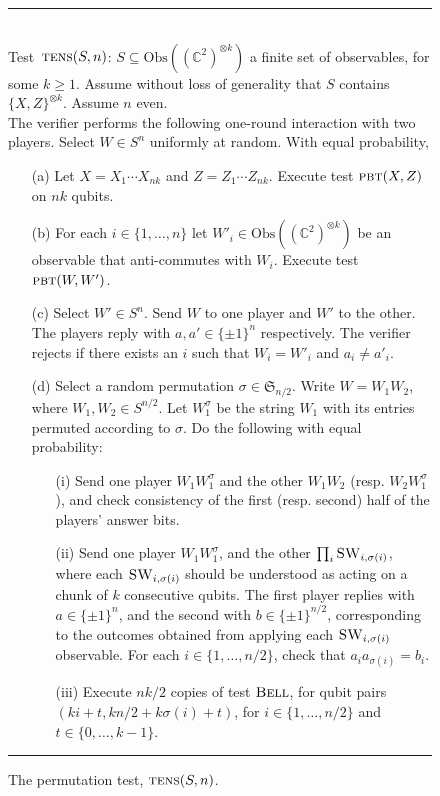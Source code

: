 \documentclass[11pt]{article}
\theoremstyle{remark}
\theoremstyle{definition}
\newcommand{\C}{\ensuremath{\mathbb{C}}}
\newcommand{\setft}[1]{\mathrm{#1}}
\newcommand{\Obs}{\setft{Obs}}
\newcommand{\pbt}{\textsc{pbt}}
\newcommand{\perm}{\textsc{tens}}
\newcommand{\bellt}{\textsc{Bell}}
\newcommand{\SWAP}{\textsc{SW}}
\begin{document}
\begin{figure}[H]
\rule[1ex]{16.5cm}{0.5pt}\\
Test~$\perm(S,n)$: $S\subseteq \Obs((\C^2)^{\otimes k})$ a finite set of observables, for some $k\geq 1$. Assume without loss of generality that $S$ contains $\{X,Z\}^{\otimes k}$. Assume $n$ even. \\
The verifier performs the following one-round interaction with two
players. Select $W \in S^n$ uniformly at random. With equal probability,
\begin{enumerate}
\item[(a)] Let $X = X_1\cdots X_{nk}$ and $Z=Z_1\cdots Z_{nk}$. Execute test $\pbt(X,Z)$ on $nk$ qubits. 
\item[(b)] For each $i\in\{1,\ldots,n\}$ let $W'_i\in\Obs((\C^2)^{\otimes k})$ be an observable that anti-commutes with $W_i$. Execute test $\pbt(W,W')$. 
\item[(c)] Select $W' \in S^n$. Send $W$ to one player and $W'$ to the other. The players reply with $a,a'\in\{\pm 1\}^n$ respectively. The verifier rejects if there exists an $i$ such that $W_i=W'_i$ and $a_i\neq a'_i$.
\item[(d)] Select a random permutation  $\sigma \in \mathfrak{S}_{n/2}$. Write $W=W_1 W_2$, where $W_1,W_2\in S^{n/2}$. Let $W_1^\sigma$ be the string $W_1$ with its entries permuted according to $\sigma$. Do the following with equal probability: 
\begin{enumerate}
\item[(i)] Send one player $W_1 W_1^\sigma$ and the other $W_1 W_2$ (resp. $W_2W_1^\sigma$), and check consistency of the first (resp. second) half of the players' answer bits.
\item[(ii)] Send one player $W_1  W_1^\sigma$, and the other $\prod_i \SWAP_{i,\sigma(i)}$, where each $\SWAP_{i,\sigma(i)}$ should be understood as acting on a chunk of $k$ consecutive qubits. 
    The first player replies with $a\in\{\pm 1 \}^n$, and the second with $b\in\{\pm1\}^{n/2}$,  corresponding to the outcomes obtained from applying each $\SWAP_{i,\sigma(i)}$ observable. For each
    $i\in\{1,\ldots,n/2\}$, check that $a_i a_{\sigma(i)} = b_i$. 
\item[(iii)] Execute $nk/2$ copies of test $\bellt$, for qubit pairs $(ki+t,kn/2+k\sigma(i)+t)$, for $i\in\{1,\ldots,n/2\}$ and $t\in\{0,\ldots,k-1\}$. 
\end{enumerate}
\end{enumerate}
\rule[2ex]{16.5cm}{0.5pt}\vspace{-1cm}
\caption{The permutation test, $\perm(S,n)$.}
\label{fig:clifford-test}
\end{figure}
\end{document}
